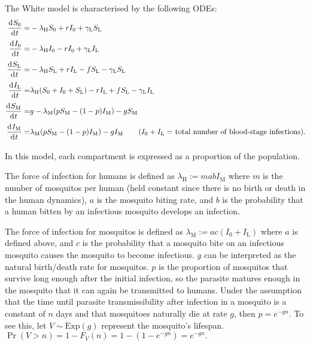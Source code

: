 The White model is characterised by the following
ODEs:
\begin{align*}
    \frac{\diff S_0}{\diff t}
    = & -\lambda_\mathrm{H} S_0 + rI_0 + \gamma_\mathrm{L}S_\mathrm{L} \\
    \frac{\diff I_0}{\diff t}
    = & -\lambda_\mathrm{H} I_0 - rI_0 + \gamma_\mathrm{L}I_\mathrm{L} \\
    \frac{\diff S_\mathrm{L}}{\diff t}
    = & -\lambda_\mathrm{H} S_\mathrm{L} + rI_\mathrm{L}
    - fS_\mathrm{L} -\gamma_\mathrm{L}S_\mathrm{L}                     \\
    \frac{\diff I_\mathrm{L}}{\diff t}
    = & \lambda_\mathrm{H} (S_0 + I_0 + S_\mathrm{L}) - rI_\mathrm{L}
    + fS_\mathrm{L} -\gamma_\mathrm{L}I_\mathrm{L}                     \\
    \frac{\diff S_\mathrm{M}}{\diff t}
    = & g - \lambda_\mathrm{M}(pS_\mathrm{M}
    - (1 - p)I_\mathrm{M}) - gS_\mathrm{M}                             \\
    \frac{\diff I_\mathrm{M}}{\diff t}
    = & \lambda_\mathrm{M}(pS_\mathrm{M} - (1 - p)I_\mathrm{M})
    - gI_\mathrm{M}
    \tag{$I_0 + I_\mathrm{L}=$ total number of blood-stage infections}.
\end{align*}

In this model, each compartment is expressed as a proportion of the population.

The force of infection for humans is defined as
$\lambda_\mathrm{H} := mabI_\mathrm{M}$ where $m$ is the number of mosquitos
per human (held constant since there is no birth or death in the human
dynamics), $a$ is the mosquito biting rate, and $b$ is the probability that a
human bitten by an infectious mosquito develops an infection.

The force of infection for mosquitos is defined as
$\lambda_\mathrm{M} := ac(I_0 + I_\mathrm{L})$ where $a$ is defined above,
and $c$ is the probability that a mosquito bite on an infectious mosquito
causes the mosquito to become infectious. $g$ can be interpreted as the natural
birth/death rate for mosquitos. $p$ is the proportion of mosquitos that
survive long enough after the initial infection, so the parasite matures
enough in the mosquito that it can again be transmitted to humans.
Under the assumption that the time until parasite transmissibility after
infection in a mosquito is a constant of $n$ days and that mosquitoes naturally
die at rate $g$, then $p=e^{-gn}.$ To see this, let $V\sim\mathrm{Exp}(g)$
represent the mosquito's lifespan.
$\Pr(V > n)= 1 - F_V(n) = 1 - (1 - e^{-gn}) = e^{-gn}.$

